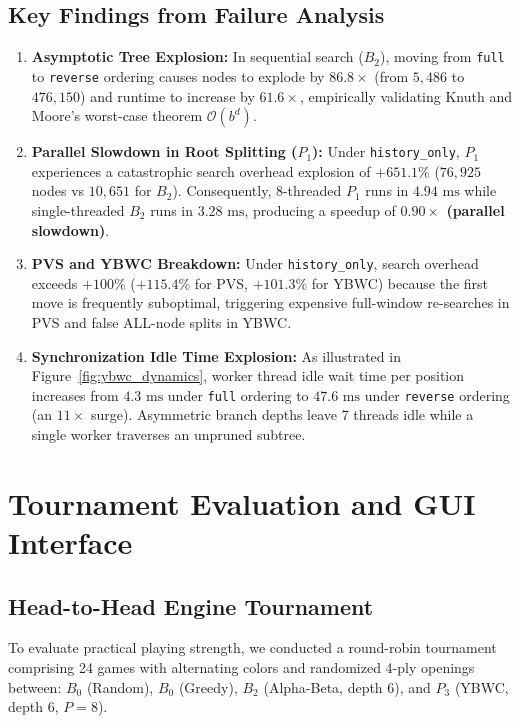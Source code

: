 \documentclass[11pt,a4paper]{article}
\begin{document}
\subsection{Key Findings from Failure Analysis}
\begin{enumerate}
    \item \textbf{Asymptotic Tree Explosion:} In sequential search ($B_2$), moving from \texttt{full} to \texttt{reverse} ordering causes nodes to explode by \textbf{$86.8\times$} (from $5,486$ to $476,150$) and runtime to increase by \textbf{$61.6\times$}, empirically validating Knuth and Moore's worst-case theorem $\mathcal{O}(b^d)$.
    \item \textbf{Parallel Slowdown in Root Splitting ($P_1$):} Under \texttt{history\_only}, $P_1$ experiences a catastrophic search overhead explosion of \textbf{$+651.1\%$} ($76,925$ nodes vs $10,651$ for $B_2$). Consequently, 8-threaded $P_1$ runs in $4.94\text{ ms}$ while single-threaded $B_2$ runs in $3.28\text{ ms}$, producing a speedup of \textbf{$0.90\times$ (parallel slowdown)}.
    \item \textbf{PVS and YBWC Breakdown:} Under \texttt{history\_only}, search overhead exceeds $+100\%$ ($+115.4\%$ for PVS, $+101.3\%$ for YBWC) because the first move is frequently suboptimal, triggering expensive full-window re-searches in PVS and false ALL-node splits in YBWC.
    \item \textbf{Synchronization Idle Time Explosion:} As illustrated in Figure~\ref{fig:ybwc_dynamics}, worker thread idle wait time per position increases from $4.3\text{ ms}$ under \texttt{full} ordering to \textbf{$47.6\text{ ms}$} under \texttt{reverse} ordering (an $11\times$ surge). Asymmetric branch depths leave 7 threads idle while a single worker traverses an unpruned subtree.
\end{enumerate}

\section{Tournament Evaluation and GUI Interface}
\label{sec:tournament_gui}

\subsection{Head-to-Head Engine Tournament}
To evaluate practical playing strength, we conducted a round-robin tournament comprising 24 games with alternating colors and randomized 4-ply openings between: $B_0$ (Random), $B_0$ (Greedy), $B_2$ (Alpha-Beta, depth 6), and $P_3$ (YBWC, depth 6, $P=8$). 
\end{document}

